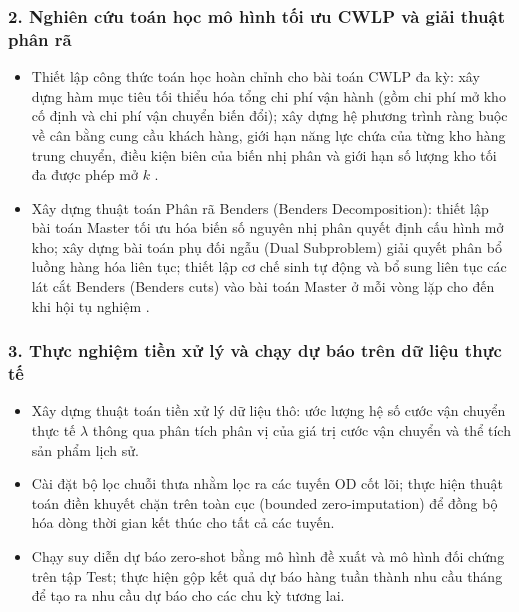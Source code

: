 \subsubsection{\large 2. Nghiên cứu toán học mô hình tối ưu CWLP và giải thuật phân rã}
\begin{itemize}
    \item Thiết lập công thức toán học hoàn chỉnh cho bài toán CWLP đa kỳ: xây dựng hàm mục tiêu tối thiểu hóa tổng chi phí vận hành (gồm chi phí mở kho cố định và chi phí vận chuyển biến đổi); xây dựng hệ phương trình ràng buộc về cân bằng cung cầu khách hàng, giới hạn năng lực chứa của từng kho hàng trung chuyển, điều kiện biên của biến nhị phân và giới hạn số lượng kho tối đa được phép mở $k$ \cite{milazzo2022}.
    \item Xây dựng thuật toán Phân rã Benders (Benders Decomposition): thiết lập bài toán Master tối ưu hóa biến số nguyên nhị phân quyết định cấu hình mở kho; xây dựng bài toán phụ đối ngẫu (Dual Subproblem) giải quyết phân bổ luồng hàng hóa liên tục; thiết lập cơ chế sinh tự động và bổ sung liên tục các lát cắt Benders (Benders cuts) vào bài toán Master ở mỗi vòng lặp cho đến khi hội tụ nghiệm \cite{sadatasl2021}.
\end{itemize}

\subsubsection{\large 3. Thực nghiệm tiền xử lý và chạy dự báo trên dữ liệu thực tế}
\begin{itemize}
    \item Xây dựng thuật toán tiền xử lý dữ liệu thô: ước lượng hệ số cước vận chuyển thực tế $\lambda$ thông qua phân tích phân vị của giá trị cước vận chuyển và thể tích sản phẩm lịch sử.
    \item Cài đặt bộ lọc chuỗi thưa nhằm lọc ra các tuyến OD cốt lõi; thực hiện thuật toán điền khuyết chặn trên toàn cục (bounded zero-imputation) để đồng bộ hóa dòng thời gian kết thúc cho tất cả các tuyến.
    \item Chạy suy diễn dự báo zero-shot bằng mô hình đề xuất và mô hình đối chứng trên tập Test; thực hiện gộp kết quả dự báo hàng tuần thành nhu cầu tháng để tạo ra nhu cầu dự báo cho các chu kỳ tương lai.
\end{itemize}

